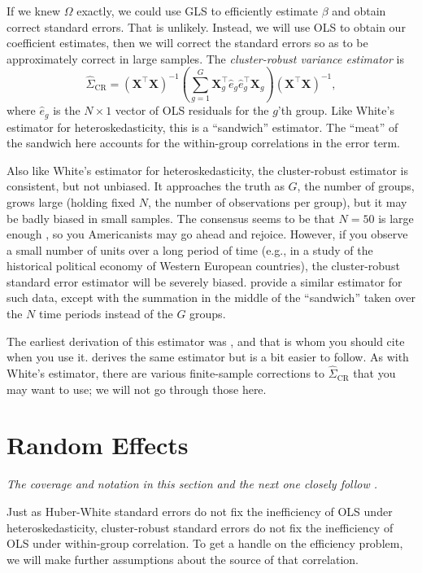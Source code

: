 \documentclass[12pt,oneside,openany]{book}
\begin{document}
If we knew \(\Omega\) exactly, we could use GLS to efficiently estimate
\(\beta\) and obtain correct standard errors. That is unlikely. Instead,
we will use OLS to obtain our coefficient estimates, then we will
correct the standard errors so as to be approximately correct in large
samples. The \emph{cluster-robust variance estimator} is \[
\hat{\Sigma}_{\text{CR}} =
(\mathbf{X}^\top \mathbf{X})^{-1}
\left( \sum_{g=1}^G \mathbf{X}_g^\top \hat{e}_g \hat{e}_g^\top \mathbf{X}_g \right)
(\mathbf{X}^\top \mathbf{X})^{-1},
\] where \(\hat{e}_g\) is the \(N \times 1\) vector of OLS residuals for
the \(g\)'th group. Like White's estimator for heteroskedasticity, this
is a ``sandwich'' estimator. The ``meat'' of the sandwich here accounts
for the within-group correlations in the error term.

Also like White's estimator for heteroskedasticity, the cluster-robust
estimator is consistent, but not unbiased. It approaches the truth as
\(G\), the number of groups, grows large (holding fixed \(N\), the
number of observations per group), but it may be badly biased in small
samples. The consensus seems to be that \(N = 50\) is large enough
\citep{Cameron:2015ud}, so you Americanists may go ahead and rejoice.
However, if you observe a small number of units over a long period of
time (e.g., in a study of the historical political economy of Western
European countries), the cluster-robust standard error estimator will be
severely biased. \citet{Beck:1995hm} provide a similar estimator for
such data, except with the summation in the middle of the ``sandwich''
taken over the \(N\) time periods instead of the \(G\) groups.

The earliest derivation of this estimator was \citet{Liang:1986gv}, and
that is whom you should cite when you use it. \citet{Arellano:1987jx}
derives the same estimator but is a bit easier to follow. As with
White's estimator, there are various finite-sample corrections to
\(\hat{\Sigma}_{\text{CR}}\) that you may want to use; we will not go
through those here.

\section{Random Effects}\label{random-effects}

\emph{The coverage and notation in this section and the next one closely
follow \citet[chapter 12]{Johnston:1997um}.}

Just as Huber-White standard errors do not fix the inefficiency of OLS
under heteroskedasticity, cluster-robust standard errors do not fix the
inefficiency of OLS under within-group correlation. To get a handle on
the efficiency problem, we will make further assumptions about the
source of that correlation.
\end{document}
